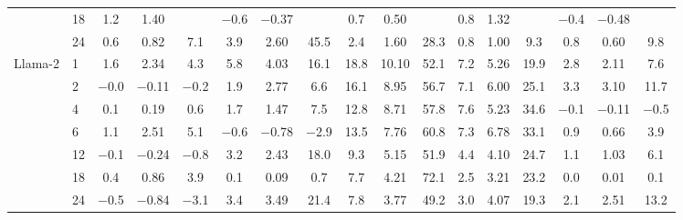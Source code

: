 \begin{table}[htbp]
{\begin{adjustbox}{max width=\linewidth, max totalheight=0.28\textheight}
\begin{tabular}{llccccccccccccccc}
 & 18 & \phantom{$-$}1.2 & \phantom{$-$}1.40 &  & $-$0.6 & $-$0.37 &  & \phantom{0}0.7 & \phantom{0}0.50 &  & 0.8 & 1.32 &  & $-$0.4 & $-$0.48 &  \\
 & 24 & \phantom{$-$}0.6 & \phantom{$-$}0.82 & \phantom{$-$0}7.1 & \phantom{$-$}3.9 & \phantom{$-$}2.60 & \phantom{$-$}45.5 & \phantom{0}2.4 & \phantom{0}1.60 & 28.3 & 0.8 & 1.00 & \phantom{0}9.3 & \phantom{$-$}0.8 & \phantom{$-$}0.60 & \phantom{$-$0}9.8 \\
\midrule
Llama-2 & 1 & \phantom{$-$}1.6 & \phantom{$-$}2.34 & \phantom{$-$0}4.3 & \phantom{$-$}5.8 & \phantom{$-$}4.03 & \phantom{$-$}16.1 & 18.8 & 10.10 & 52.1 & 7.2 & 5.26 & 19.9 & \phantom{$-$}2.8 & \phantom{$-$}2.11 & \phantom{$-$0}7.6 \\
 & 2 & $-$0.0 & $-$0.11 & \phantom{0}$-$0.2 & \phantom{$-$}1.9 & \phantom{$-$}2.77 & \phantom{$-$0}6.6 & 16.1 & \phantom{0}8.95 & 56.7 & 7.1 & 6.00 & 25.1 & \phantom{$-$}3.3 & \phantom{$-$}3.10 & \phantom{$-$}11.7 \\
 & 4 & \phantom{$-$}0.1 & \phantom{$-$}0.19 & \phantom{$-$0}0.6 & \phantom{$-$}1.7 & \phantom{$-$}1.47 & \phantom{$-$0}7.5 & 12.8 & \phantom{0}8.71 & 57.8 & 7.6 & 5.23 & 34.6 & $-$0.1 & $-$0.11 & \phantom{0}$-$0.5 \\
 & 6 & \phantom{$-$}1.1 & \phantom{$-$}2.51 & \phantom{$-$0}5.1 & $-$0.6 & $-$0.78 & \phantom{0}$-$2.9 & 13.5 & \phantom{0}7.76 & 60.8 & 7.3 & 6.78 & 33.1 & \phantom{$-$}0.9 & \phantom{$-$}0.66 & \phantom{$-$0}3.9 \\
 & 12 & $-$0.1 & $-$0.24 & \phantom{0}$-$0.8 & \phantom{$-$}3.2 & \phantom{$-$}2.43 & \phantom{$-$}18.0 & \phantom{0}9.3 & \phantom{0}5.15 & 51.9 & 4.4 & 4.10 & 24.7 & \phantom{$-$}1.1 & \phantom{$-$}1.03 & \phantom{$-$0}6.1 \\
 & 18 & \phantom{$-$}0.4 & \phantom{$-$}0.86 & \phantom{$-$0}3.9 & \phantom{$-$}0.1 & \phantom{$-$}0.09 & \phantom{$-$0}0.7 & \phantom{0}7.7 & \phantom{0}4.21 & 72.1 & 2.5 & 3.21 & 23.2 & \phantom{$-$}0.0 & \phantom{$-$}0.01 & \phantom{$-$0}0.1 \\
 & 24 & $-$0.5 & $-$0.84 & \phantom{0}$-$3.1 & \phantom{$-$}3.4 & \phantom{$-$}3.49 & \phantom{$-$}21.4 & \phantom{0}7.8 & \phantom{0}3.77 & 49.2 & 3.0 & 4.07 & 19.3 & \phantom{$-$}2.1 & \phantom{$-$}2.51 & \phantom{$-$}13.2 \\
\bottomrule
\end{tabular}
\end{adjustbox}
}
\end{table}
